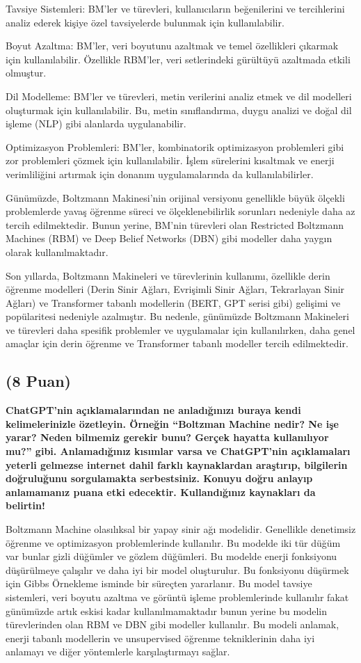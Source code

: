 \documentclass[11pt]{article}
\begin{document}
Tavsiye Sistemleri: BM'ler ve türevleri, kullanıcıların beğenilerini ve tercihlerini analiz ederek kişiye özel tavsiyelerde bulunmak için kullanılabilir.

Boyut Azaltma: BM'ler, veri boyutunu azaltmak ve temel özellikleri çıkarmak için kullanılabilir. Özellikle RBM'ler, veri setlerindeki gürültüyü azaltmada etkili olmuştur.

Dil Modelleme: BM'ler ve türevleri, metin verilerini analiz etmek ve dil modelleri oluşturmak için kullanılabilir. Bu, metin sınıflandırma, duygu analizi ve doğal dil işleme (NLP) gibi alanlarda uygulanabilir.

Optimizasyon Problemleri: BM'ler, kombinatorik optimizasyon problemleri gibi zor problemleri çözmek için kullanılabilir. İşlem sürelerini kısaltmak ve enerji verimliliğini artırmak için donanım uygulamalarında da kullanılabilirler.

Günümüzde, Boltzmann Makinesi'nin orijinal versiyonu genellikle büyük ölçekli problemlerde yavaş öğrenme süreci ve ölçeklenebilirlik sorunları nedeniyle daha az tercih edilmektedir. Bunun yerine, BM'nin türevleri olan Restricted Boltzmann Machines (RBM) ve Deep Belief Networks (DBN) gibi modeller daha yaygın olarak kullanılmaktadır.

Son yıllarda, Boltzmann Makineleri ve türevlerinin kullanımı, özellikle derin öğrenme modelleri (Derin Sinir Ağları, Evrişimli Sinir Ağları, Tekrarlayan Sinir Ağları) ve Transformer tabanlı modellerin (BERT, GPT serisi gibi) gelişimi ve popülaritesi nedeniyle azalmıştır. Bu nedenle, günümüzde Boltzmann Makineleri ve türevleri daha spesifik problemler ve uygulamalar için kullanılırken, daha genel amaçlar için derin öğrenme ve Transformer tabanlı modeller tercih edilmektedir.

\subsection{(8 Puan)} \textbf{ChatGPT’nin açıklamalarından ne anladığınızı buraya kendi kelimelerinizle özetleyin. Örneğin ``Boltzman Machine nedir? Ne işe yarar? Neden bilmemiz gerekir bunu? Gerçek hayatta kullanılıyor mu?'' gibi. Anlamadığınız kısımlar varsa ve ChatGPT’nin açıklamaları yeterli gelmezse internet dahil farklı kaynaklardan araştırıp, bilgilerin doğruluğunu sorgulamakta serbestsiniz. Konuyu doğru anlayıp anlamamanız puana etki edecektir. Kullandığınız kaynakları da belirtin!}

Boltzmann Machine olasılıksal bir yapay sinir ağı modelidir. Genellikle denetimsiz öğrenme ve optimizasyon problemlerinde kullanılır. Bu modelde iki tür düğüm var bunlar gizli düğümler ve gözlem düğümleri. Bu modelde enerji fonksiyonu düşürülmeye çalışılır ve daha iyi bir model oluşturulur. Bu fonksiyonu düşürmek için Gibbs Örnekleme isminde bir süreçten yararlanır. 
Bu model tavsiye sistemleri, veri boyutu azaltma ve görüntü işleme problemlerinde kullanılır fakat günümüzde artık eskisi kadar kullanılmamaktadır bunun yerine bu modelin türevlerinden olan RBM ve DBN gibi modeller kullanılır.
Bu modeli anlamak, enerji tabanlı modellerin ve unsupervised öğrenme tekniklerinin daha iyi anlamayı ve diğer yöntemlerle karşılaştırmayı sağlar.
\end{document}
